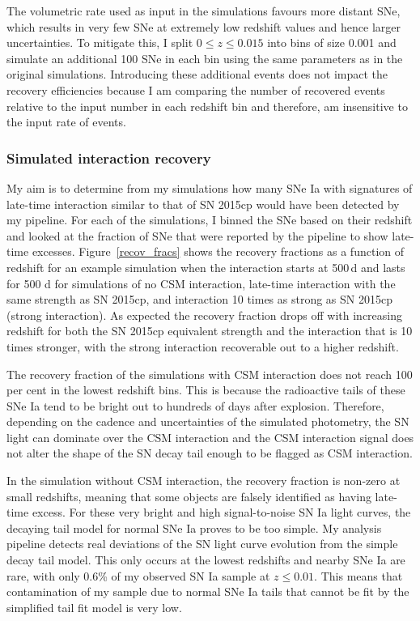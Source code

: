 \documentclass[a4paper,oneside,12pt, class=Latex/Classes/PhDthesisPSnPDF, crop=false]{standalone}
\begin{document}
The volumetric rate used as input in the simulations favours more distant SNe, which results in very few SNe at extremely low redshift values and hence larger uncertainties. To mitigate this, I split $0\leq z\leq 0.015$ into bins of size 0.001 and simulate an additional 100 SNe in each bin using the same parameters as in the original simulations. Introducing these additional events does not impact the recovery efficiencies because I am comparing the number of recovered events relative to the input number in each redshift bin and therefore, am insensitive to the input rate of events. 


\subsubsection{Simulated interaction recovery}
\label{simulated_reco}
My aim is to determine from my simulations how many SNe Ia with signatures of late-time interaction similar to that of SN 2015cp would have been detected by my pipeline. For each of the simulations, I binned the SNe based on their redshift and looked at the fraction of SNe that were reported by the pipeline to show late-time excesses. Figure~\ref{recov_fracs} shows the recovery fractions as a function of redshift for an example simulation when the interaction starts at 500\,d and lasts for 500 d for simulations of no CSM interaction, late-time interaction with the same strength as SN 2015cp, and interaction 10 times as strong as SN 2015cp (strong interaction). As expected the recovery fraction drops off with increasing redshift for both the SN 2015cp equivalent strength and the interaction that is 10 times stronger, with the strong interaction recoverable out to a higher redshift. 

The recovery fraction of the simulations with CSM interaction does not reach 100 per cent in the lowest redshift bins. This is because the radioactive tails of these SNe Ia tend to be bright out to hundreds of days after explosion. Therefore, depending on the cadence and uncertainties of the simulated photometry, the SN light can dominate over the CSM interaction and the CSM interaction signal does not alter the shape of the SN decay tail enough to be flagged as CSM interaction. 

In the simulation without CSM interaction, the recovery fraction is non-zero at small redshifts, meaning that some objects are falsely identified as having late-time excess. For these very bright and high signal-to-noise SN Ia light curves, the decaying tail model for normal SNe Ia proves to be too simple. My analysis pipeline detects real deviations of the SN light curve evolution from the simple decay tail model. This only occurs at the lowest redshifts and nearby SNe Ia are rare, with only 0.6\% of my observed SN Ia sample at $z\leq0.01$. This means that contamination of my sample due to normal SNe Ia tails that cannot be fit by the simplified tail fit model is very low. 
\end{document}
